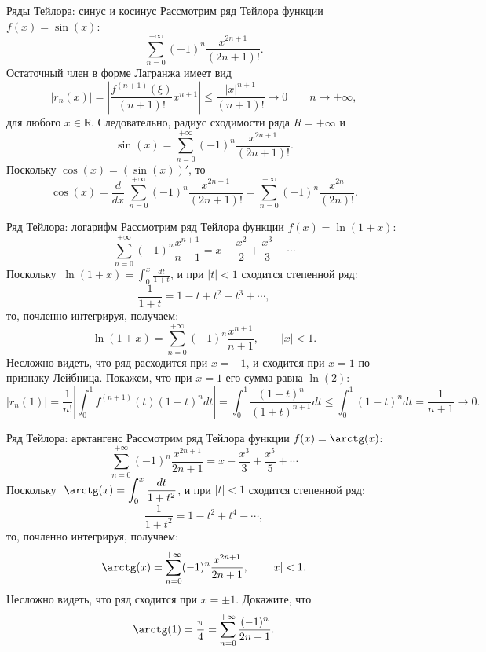 \documentclass[8pt]{beamer}
\begin{document}
\begin{frame}{Ряды Тейлора: синус и косинус}
Рассмотрим ряд Тейлора функции $ f(x) =\sin(x)$:
$$\sum_{n=0}^{+\infty} (-1)^n \frac{x^{2n+1}}{(2n+1)!}.$$
Остаточный член в форме Лагранжа имеет вид
$$|r_n(x)| = \left| \frac{f^{(n+1)}(\xi)}{(n+1)!}x^{n+1} \right| 
\le \frac{|x|^{n+1}}{(n+1)!} \to0 \qquad n\to+\infty,$$
для любого $x\in\mathbb{R}$. Следовательно, радиус сходимости ряда $R=+\infty$ и
$$\sin(x) = \sum_{n=0}^{+\infty}(-1)^n \frac{x^{2n+1}}{(2n+1)!}.$$
Поскольку $\cos(x) = (\sin(x))'$, то
$$\cos(x) = \frac{d}{dx}\ \sum_{n=0}^{+\infty}(-1)^n \frac{x^{2n+1}}{(2n+1)!} = \sum_{n=0}^{+\infty}(-1)^n \frac{x^{2n}}{(2n)!}.$$
\end{frame}

\begin{frame}{Ряд Тейлора: логарифм}
Рассмотрим ряд Тейлора функции $ f(x) =\ln(1+x)$:
$$\sum_{n=0}^{+\infty}(-1)^n\frac{x^{n+1}}{n+1}= x-\frac{x^2}{2}+\frac{x^3}{3}+\cdots$$
Поскольку  $\ \displaystyle \ln(1+x) = \int_{0}^x\frac{dt}{1+t}$,
и при $|t|<1$ сходится степенной ряд:
$$\frac{1}{1+t} = 1-t+t^2-t^3+\cdots,$$
то, почленно интегрируя, получаем:
$$\ln(1+x) = \sum_{n=0}^{+\infty}(-1)^n\frac{x^{n+1}}{n+1},\qquad |x|<1.$$
Несложно видеть, что ряд расходится при $x=-1$, и сходится при $x=1$ по признаку Лейбница. Покажем, что при $x=1$ его сумма равна $\ln(2)$:
$$|r_n(1)|=\frac{1}{n!}\left|\int_0^1 f^{(n+1)}(t)(1-t)^n dt\right|=
\int_0^1 \frac{(1-t)^n}{(1+t)^{n+1}} dt\le \int_0^1(1-t)^n dt = \frac{1}{n+1}\to0.$$
\end{frame}

\begin{frame}{Ряд Тейлора: арктангенс}
Рассмотрим ряд Тейлора функции $ f(x) =\arctg(x)$:
$$\sum_{n=0}^{+\infty}(-1)^n\frac{x^{2n+1}}{2n+1}= x-\frac{x^3}{3}+\frac{x^5}{5}+\cdots$$
Поскольку  $\ \displaystyle \arctg(x) = \int_{0}^x\frac{dt}{1+t^2}$,
и при $|t|<1$ сходится степенной ряд:
$$\frac{1}{1+t^2} = 1-t^2+t^4-\cdots,$$
то, почленно интегрируя, получаем:
$$\arctg(x) = \sum_{n=0}^{+\infty}(-1)^n\frac{x^{2n+1}}{2n+1},\qquad |x|<1.$$
Несложно видеть, что ряд сходится при $x=\pm1$. Докажите, что
$$\arctg(1) = \frac{\pi}{4} = \sum_{n=0}^{+\infty}\frac{(-1)^n}{2n+1}.$$
\end{frame}
\end{document}
